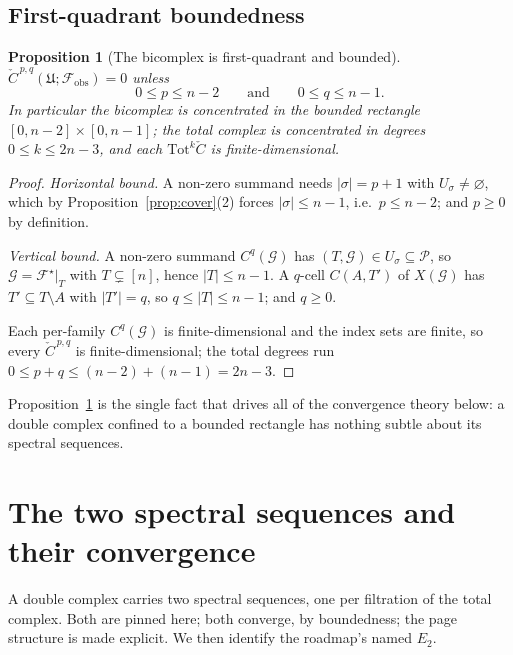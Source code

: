 \documentclass[11pt,oneside]{amsart}
\theoremstyle{plain}
\newtheorem{proposition}[theorem]{Proposition}
\theoremstyle{definition}
\theoremstyle{remark}
\theoremstyle{honeststyle}
\newcommand{\F}{\mathcal{F}}
\newcommand{\G}{\mathcal{G}}
\newcommand{\Fstar}{\F^{\star}}
\newcommand{\Tot}{\mathrm{Tot}}
\newcommand{\fobs}{\mathcal{F}_{\mathrm{obs}}}
\newcommand{\Pp}{\mathcal{P}}
\newcommand{\Uf}{\mathfrak{U}}
\newcommand{\Ccheck}{\check{C}}
\begin{document}
\subsection{First-quadrant boundedness}
\label{ssec:bounded}

\begin{proposition}[The bicomplex is first-quadrant and bounded]
\label{prop:bounded}
$\Ccheck^{\,p,q}(\Uf;\fobs)=0$ unless
\[
  0\le p\le n-2
  \qquad\text{and}\qquad
  0\le q\le n-1.
\]
In particular the bicomplex is concentrated in the bounded rectangle
$[0,n-2]\times[0,n-1]$; the total complex is concentrated in degrees
$0\le k\le 2n-3$, and each $\Tot^{k}\Ccheck$ is finite-dimensional.
\end{proposition}

\begin{proof}
\emph{Horizontal bound.} A non-zero summand needs $|\sigma|=p+1$ with
$U_{\sigma}\neq\varnothing$, which by Proposition~\ref{prop:cover}(2)
forces $|\sigma|\le n-1$, i.e.\ $p\le n-2$; and $p\ge0$ by definition.

\emph{Vertical bound.} A non-zero summand $C^{q}(\G)$ has $(T,\G)\in
U_{\sigma}\subseteq\Pp$, so $\G=\Fstar|_{T}$ with $T\subsetneq[n]$,
hence $|T|\le n-1$. A $q$-cell $C(A,T')$ of $X(\G)$ has $T'\subseteq
T\setminus A$ with $|T'|=q$, so $q\le|T|\le n-1$; and $q\ge0$.

Each per-family $C^{q}(\G)$ is finite-dimensional and the index sets
are finite, so every $\Ccheck^{\,p,q}$ is finite-dimensional; the
total degrees run $0\le p+q\le(n-2)+(n-1)=2n-3$.
\end{proof}

Proposition~\ref{prop:bounded} is the single fact that drives all of
the convergence theory below: a double complex confined to a bounded
rectangle has nothing subtle about its spectral sequences.

\section{The two spectral sequences and their convergence}
\label{sec:ss}

A double complex carries two spectral sequences, one per filtration of
the total complex. Both are pinned here; both converge, by
boundedness; the page structure is made explicit. We then identify the
roadmap's named $E_{2}$.
\end{document}
